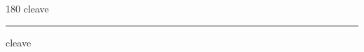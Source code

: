 
\begin{frame}
\begin{center}
\begin{turn}{180}
{\fontsize{2.5cm}{1em}\selectfont cleave}
\end{turn}
\vspace{1em}\par  
\hrule
\vspace{1em}\par  
{\fontsize{2.5cm}{1em}\selectfont cleave}
\end{center}
\end{frame}

